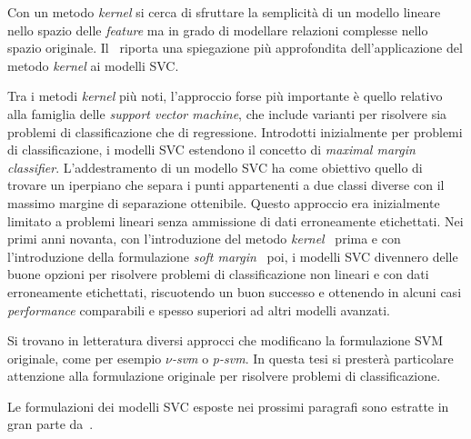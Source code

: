 Con un metodo \emph{kernel} si cerca di sfruttare la semplicità di un modello lineare nello spazio delle \emph{feature} ma in grado di modellare relazioni complesse nello spazio originale.
Il~ riporta una spiegazione più approfondita dell'applicazione del metodo \emph{kernel} ai modelli SVC.

Tra i metodi \emph{kernel} più noti, l'approccio forse più importante è quello relativo alla famiglia delle \emph{support vector machine}, che include varianti per risolvere sia problemi di classificazione che di regressione.
Introdotti inizialmente per problemi di classificazione, i modelli SVC estendono il concetto di \emph{maximal margin classifier}. 
L'addestramento di un modello SVC ha come obiettivo quello di trovare un iperpiano che separa i punti appartenenti a due classi diverse con il massimo margine di separazione ottenibile. 
Questo approccio era inizialmente limitato a problemi lineari senza ammissione di dati erroneamente etichettati. 
Nei primi anni novanta, con l'introduzione del metodo \emph{kernel}~\cite{1992_hardmargin_svm} prima e con l'introduzione della formulazione \emph{soft margin}~\cite{1995_svm} poi, i modelli SVC divennero delle buone opzioni per risolvere problemi di classificazione non lineari e con dati erroneamente etichettati, riscuotendo un buon successo e ottenendo in alcuni casi \emph{performance} comparabili e spesso superiori ad altri modelli avanzati. 

Si trovano in letteratura diversi approcci che modificano la formulazione SVM originale, come per esempio \emph{$\nu$-svm}\cite{2000_nu_svm} o  \emph{p-svm}\cite{2001_p_svm}.
In questa tesi si presterà particolare attenzione alla formulazione originale per risolvere problemi di classificazione.

Le formulazioni dei modelli SVC esposte nei prossimi paragrafi sono estratte in gran parte da~\cite{1995_svm,svm_tutorial,elements-of-statistical-learning,RKHS}.

